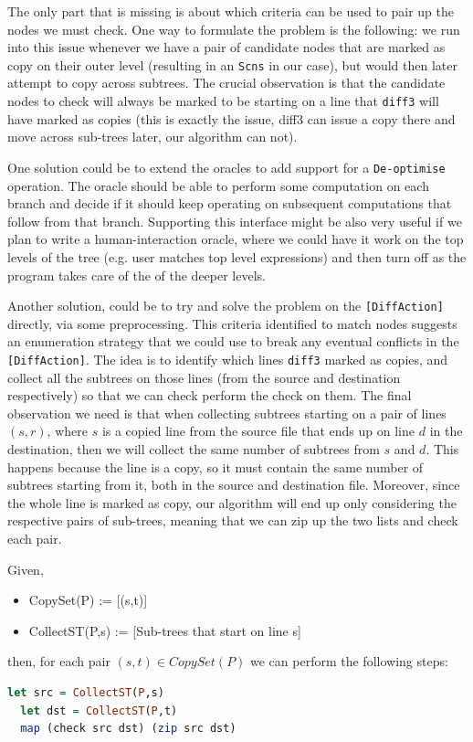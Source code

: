 \documentclass[11pt]{article}
\begin{document}
The only part that is missing is about which criteria can be used to pair up the 
nodes we must check. One way to formulate the problem is the following: we run 
into this issue whenever we have a pair of candidate nodes that are marked as copy on 
their outer level (resulting in an \texttt{Scns} in our case), but would then later attempt to copy across 
subtrees.  The crucial observation is that the candidate nodes to check will 
always be marked to be starting on a line that \texttt{diff3} will have marked 
as copies (this is exactly the issue, diff3 can issue a copy there and move across sub-trees later, our algorithm can 
not). 

One solution could be to extend the oracles to add support for a \texttt{De-optimise} 
operation. The oracle should be able to perform some computation on each branch 
and decide if it should keep operating on subsequent computations that follow from that branch. 
Supporting this interface might be also very useful if we plan to write a human-interaction oracle, where we could have 
it work on the top levels of the tree (e.g. user matches top level expressions) 
and then turn off as the program takes care of the of the deeper levels. 

Another solution, could be to try and solve the problem on the \texttt{[DiffAction]} directly, via some preprocessing.
This criteria identified to match nodes suggests an enumeration strategy that we 
could use to break any eventual conflicts in the \texttt{[DiffAction]}. The idea is to identify which lines \texttt{diff3}
marked as copies, and collect all the subtrees on those lines (from the source and destination respectively) so that we can check perform the check on them.
The final observation we need is that when collecting subtrees starting on a 
pair of lines $(s,r)$, where $s$ is a copied line from the source file that ends 
up on line $d$ in the destination, then we will collect the same number of 
subtrees from $s$ and $d$. This happens because the line is a copy, so it must 
contain the same number of subtrees starting from it, both in the source and 
destination file. Moreover, since the whole line is marked as copy, our algorithm will end 
up only considering the respective pairs of sub-trees, meaning that we can zip 
up the two lists and check each pair. 

Given,
\begin{itemize}
  \item CopySet(P) := [(s,t)]
  \item CollectST(P,s) := [Sub-trees that start on line s]
\end{itemize}
then, for each pair $(s,t) \in CopySet(P)$ we can perform the following steps:
\begin{lstlisting}[language=haskell]
  let src = CollectST(P,s)
  let dst = CollectST(P,t)
  map (check src dst) (zip src dst) 
\end{lstlisting}
\end{document}
